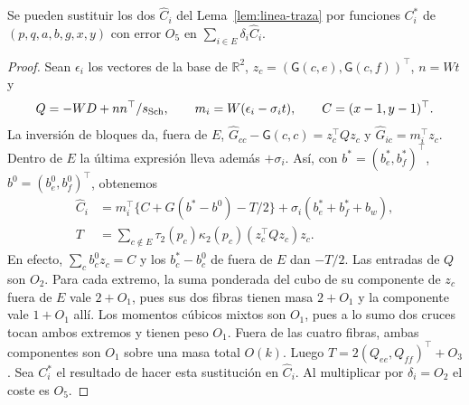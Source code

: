 \begin{lema}\label{lem:linea-reduccion}
Se pueden sustituir los dos $\widehat C_i$ del Lema~\ref{lem:linea-traza} por funciones
$C_i^*$ de $(p,q,a,b,g,x,y)$ con error $O_5$ en $\sum_{i\in E}\delta_i\widehat C_i$.
\end{lema}
\begin{proof}
Sean $\epsilon_i$ los vectores de la base de $\mathbb R^2$,
$z_c=(\mathsf G(c,e),\mathsf G(c,f))^\top$, $n=Wt$ y
\[
 Q=-WD+nn^\top/s_{\mathrm{Sch}},\qquad m_i=W(\epsilon_i-\sigma_i t),\qquad C=(x-1,y-1)^\top .
\]
La inversión de bloques da, fuera de $E$,
$\widehat G_{cc}-\mathsf G(c,c)=z_c^\top Qz_c$ y $\widehat G_{ic}=m_i^\top z_c$.
Dentro de $E$ la última expresión lleva además $+\sigma_i$.
Así, con $b^*=(b_e^*,b_f^*)^\top$, $b^0=(b_e^0,b_f^0)^\top$, obtenemos
\begin{align*}
 \widehat C_i&=m_i^\top\{C+G(b^*-b^0)-T/2\}+\sigma_i(b_e^*+b_f^*+b_w),\\
 T&=\sum_{c\notin E}\tau_2(p_c)\kappa_2(p_c)(z_c^\top Qz_c)z_c .
\end{align*}
En efecto, $\sum_cb_c^0 z_c=C$ y los $b_c^*-b_c^0$ de fuera de $E$ dan $-T/2$.
Las entradas de $Q$ son $O_2$. Para cada extremo, la suma ponderada del cubo de su
componente de $z_c$ fuera de $E$ vale $2+O_1$, pues sus dos fibras tienen masa $2+O_1$ y la
componente vale $1+O_1$ allí. Los momentos cúbicos mixtos son $O_1$, pues a lo sumo dos
cruces tocan ambos extremos y tienen peso $O_1$. Fuera de las cuatro fibras, ambas
componentes son $O_1$ sobre una masa total $O(k)$. Luego
$T=2(Q_{ee},Q_{ff})^\top+O_3$. Sea $C_i^*$ el resultado de hacer esta sustitución
en $\widehat C_i$. Al multiplicar por $\delta_i=O_2$ el coste es $O_5$.
\end{proof}

